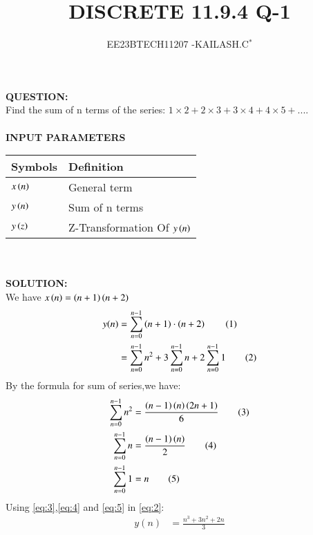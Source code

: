 \documentclass[journal,12pt,twocolumn]{IEEEtran}
\theoremstyle{remark}
\begin{document}

\vspace{3cm}

\title{DISCRETE 11.9.4 Q-1}
\author{EE23BTECH11207 -KAILASH.C$^{*}$%
}
\maketitle
\newpage
\bigskip

\renewcommand{\thefigure}{\theenumi}
\renewcommand{\thetable}{\theenumi}


\textbf{QUESTION:}\\
Find the sum of n terms of the series:
$1\times2+2\times3+3\times4+4\times5+....$\\ \\
\textbf{INPUT PARAMETERS}\\
\begin{table}[h]
\begin{tabular}{|l|l|}
\hline
\textbf{Symbols} & \textbf{Definition}\\ \hline
$x\left(n\right)$ & General term \\ \hline
$y\left(n\right)$ & Sum of n terms \\ \hline
$y\left(z\right)$ & Z-Transformation Of $y\left(n\right)$\\ \hline
\end{tabular}
\end{table}\\ \\
\textbf{SOLUTION:}\\
We have $x\left(n\right)=\left(n+1\right)\left(n+2\right)$
\begin{align}
y(n)&=\sum_{n=0}^{n-1} \left(n+1\right) \cdot \left(n+2\right)\label{eq:1}\tag{1}\\
     &=\sum_{n=0}^{n-1} n^2+3\sum_{n=0}^{n-1} n+2 \sum_{n=0}^{n-1} 1\label{eq:2}\tag{2}
\end{align}
By the formula for sum of series,we have:
\begin{align}
    \sum_{n=0}^{n-1} n^2&=\frac{\left(n-1\right)\left(n\right)\left(2n+1\right)}{6}\label{eq:3}\tag{3} \\
    \sum_{n=0}^{n-1} n&=\frac{\left(n-1\right)\left(n\right)}{2} \label{eq:4}\tag{4} \\
    \sum_{n=0}^{n-1} 1&=n \label{eq:5}\tag{5}
\end{align}
Using \eqref{eq:3},\eqref{eq:4} and \eqref{eq:5} in \eqref{eq:2}:
\begin{align}
    y(n)&=\frac{n^3+3n^2+2n}{3}\label{eq:6}\tag{6}
\end{align}\\
\end{document}
